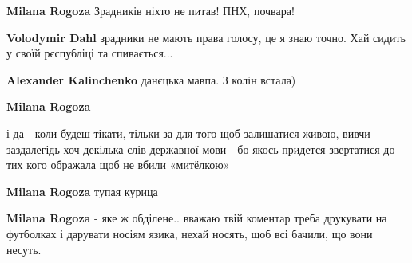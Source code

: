 \begin{itemize}
\begin{itemize}
 
\textbf{Milana Rogoza} Зрадників ніхто не питав!
ПНХ, почвара!

 
\textbf{Volodymir Dahl} зрадники не мають права голосу, це я знаю точно.
Хай сидить у своїй рєспубліці та спивається...

 
\textbf{Alexander Kalinchenko} данєцька мавпа.
З колін встала)

 
\textbf{Milana Rogoza} 

і да - коли будеш тікати, тільки за для того щоб залишатися живою, вивчи
заздалегідь хоч декілька слів державної мови - бо якось придется звертатися до
тих кого ображала щоб не вбили «митёлкою»

 
\textbf{Milana Rogoza} тупая курица

 
\textbf{Milana Rogoza} - яке ж обділене.. вважаю твій коментар треба друкувати
на футболках і дарувати носіям язика, нехай носять, щоб всі бачили, що вони
несуть.


\end{itemize}
\end{itemize}
